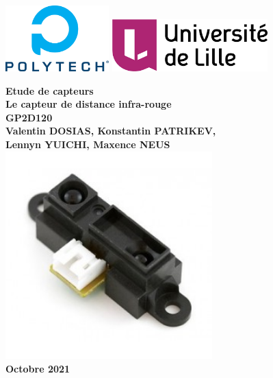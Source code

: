 \documentclass[oneside,a4paper,12pt]{article}
\begin{document}
	\begin{titlepage}
		\includegraphics[width=4cm]{logopopo.png}
		\hspace*{\fill}
		\includegraphics[width=6cm]{univlille.png}
		
		\begin{center}
			\vspace{1cm}
			\textbf{Etude de capteurs}\\
			\textbf{Le capteur de distance infra-rouge}\\
			\textbf{GP2D120}\\
			\vspace{1cm}
			\textbf{Valentin DOSIAS, Konstantin PATRIKEV,}\\
			\textbf{Lennyn YUICHI, Maxence NEUS}\\
			\vspace{3cm}
			\includegraphics[width=8cm]{capteur.jpg}\\
			\vspace{\fill}
			\textbf{Octobre 2021}\\
		\end{center}
	\end{titlepage}

	\tableofcontents
	\newpage
	
\end{document}
